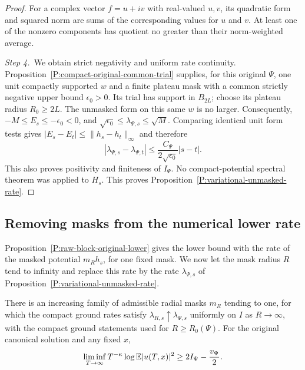 \begin{proof}
  For a complex vector $f = u+iv$ with real-valued $u,v$, its quadratic form
  and squared norm are sums of the corresponding values for $u$ and $v$. At
  least one of the nonzero components has quotient no greater than their
  norm-weighted average.

  \medskip
  \noindent\textit{Step 4.~}We obtain strict negativity and uniform rate
  continuity.
  Proposition~\ref{P:compact-original-common-trial} supplies, for this original
  $\Psi$, one unit compactly supported $w$ and a finite plateau mask with a
  common strictly negative upper bound $\epsilon_0 > 0$. Its trial has support
  in $B_{2L}$; choose its plateau radius $R_0 \ge 2L$. The unmasked form on this
  same $w$ is no larger. Consequently, $-M \le E_s \le -\epsilon_0 < 0$, and
  $\sqrt{\epsilon_0} \le \lambda_{\Psi,s} \le \sqrt M$. Comparing identical unit
  form tests gives $|E_s-E_t| \le \|h_s-h_t\|_\infty$ and therefore
  \[
    |\lambda_{\Psi,s}-\lambda_{\Psi,t}|
    \le \frac{C_\Psi}{2\sqrt{\epsilon_0}}|s-t|.
  \]
  This also proves positivity and finiteness of $I_\Psi$. No compact-potential
  spectral theorem was applied to $H_s$. This proves
  Proposition~\ref{P:variational-unmasked-rate}.
\end{proof}

\subsection{Removing masks from the numerical lower rate}

Proposition~\ref{P:raw-block-original-lower} gives the lower bound with the rate
of the masked potential $m_Rh_s$, for one fixed mask. We now let the mask radius
$R$ tend to infinity and replace this rate by the rate $\lambda_{\Psi,s}$ of
Proposition~\ref{P:variational-unmasked-rate}.

\begin{proposition}
  \label{P:variational-remove-mask}
  There is an increasing family of admissible radial masks $m_R$ tending to one,
  for which the compact ground rates satisfy
  $\lambda_{R,s}\uparrow\lambda_{\Psi,s}$ uniformly on $I$ as $R \to \infty$,
  with the compact ground statements used for $R \ge R_0(\Psi)$. For the
  original canonical solution and any fixed $x$,
  \begin{equation}\label{E:variational-unmasked-point-lower}
    \liminf_{T\to\infty}T^{-\kappa}\log\mathbb{E}|u(T,x)|^2
    \ge2I_\Psi-\frac{v_\Psi}{2}.
  \end{equation}
\end{proposition}


